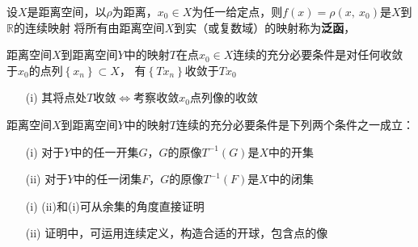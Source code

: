 \begin{newex}
    设$X$是距离空间，以$\rho$为距离，$x_0 \in X$为任一给定点，则$f(x)=\rho (x,\ x_0)$是$X$到$\mathbb R$的连续映射
    将所有由距离空间$X$到实（或复数域）的映射称为\textbf{泛函}，
\end{newex}

\begin{newthem}
    距离空间$X$到距离空间$Y$中的映射$T$在点$x_0 \in X$连续的充分必要条件是对任何收敛于$x_0$的点列$\left\{x_n\right\}\subset X$，
    有$\left\{Tx_n\right\}$收敛于$Tx_0$
\end{newthem}
\begin{note}
    \begin{itemize}
        \item [(i)]其将点处$T$收敛$\Leftrightarrow$考察收敛$x_0$点列像的收敛
    \end{itemize}
\end{note}
\begin{newthem}
    距离空间$X$到距离空间$Y$中的映射$T$连续的充分必要条件是下列两个条件之一成立：
    \begin{itemize}
        \item [(i)] 对于$Y$中的任一开集$G$，$G$的原像$T^{-1} (G)$是$X$中的开集
        \item [(ii)] 对于$Y$中的任一闭集$F$，$G$的原像$T^{-1} (F)$是$X$中的闭集
    \end{itemize}
\end{newthem}
\begin{note}
    \begin{itemize}
        \item [(i)] (ii)和(i)可从余集的角度直接证明
        \item [(ii)] 证明中，可运用连续定义，构造合适的开球，包含点的像
    \end{itemize}
\end{note}

